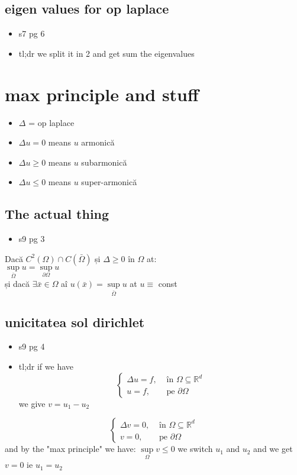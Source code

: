 \documentclass[11pt]{article}
\newcommand{\R}{\mathbb{R}} \newcommand{\C}{\mathbb{C}}
\begin{document}
\subsection*{eigen values for op laplace}
\label{sec:orga8b0bff}
\begin{itemize}
\item s7 pg 6
\item tl;dr we split it in 2 and get sum the eigenvalues
\end{itemize}

\section*{max principle and stuff}
\label{sec:orgb3e821f}
\begin{itemize}
\item \(\Delta\) = op laplace
\item \(\Delta u = 0\) means \(u\) armonică
\item \(\Delta u \geq 0\) means \(u\) subarmonică
\item \(\Delta u \leq 0\) means \(u\) super-armonică
\end{itemize}
\subsection*{The actual thing}
\label{sec:org1dadd8f}
\begin{itemize}
\item s9 pg 3
\end{itemize}
Dacă \(C^2(\Omega) \cap C(\bar{\Omega})\) și \(\Delta \geq 0 \text{ în } \Omega\)  at:\\
\(\sup\limits_{\bar{\Omega}} u = \sup\limits_{\partial \Omega} u\)\\
și dacă \(\exists \bar{x} \in \Omega\) aî \(u(\bar{x}) = \sup\limits_{\bar{\Omega}} u\) at \(u \equiv\) const
\subsection*{unicitatea sol dirichlet}
\label{sec:orgee4300a}
\begin{itemize}
\item s9 pg 4
\item tl;dr if we have
\[ 
\begin{cases}
\Delta u = f, & \text{ în } \Omega \subseteq \R^d\\
u = f, & \text{ pe } \partial \Omega
\end{cases}
\]
we give \(v = u_1 - u_2\)
\end{itemize}
\[ 
\begin{cases}
   \Delta v = 0, & \text{ în } \Omega \subseteq \R^d\\
   v = 0, & \text{ pe } \partial \Omega
   \end{cases}
   \]
and by the "max principle" we have: \(\sup\limits_\Omega v \leq 0\)
we switch \(u_1\) and \(u_2\) and we get \(v = 0\) ie \(u_1 = u_2\)
\end{document}
